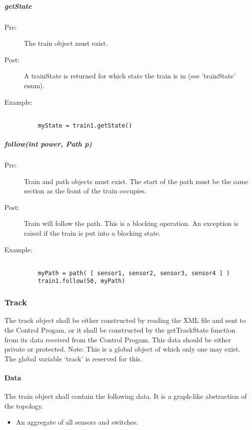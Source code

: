 \documentclass[a4paper,11pt,notitlepage]{article}
\def\CS{Control Progam\xspace}
\begin{document}
\subparagraph{getState}
\begin{description}
\item[\hspace{1cm}Pre:] The train object must exist.
\item[\hspace{1cm}Post:] A trainState is returned for which state the train is in (see 'trainState' enum).
\item[\hspace{1cm}Example:]
\begin{verbatim}

    myState = train1.getState()
\end{verbatim}
\end{description}

\subparagraph{follow(int power, Path p)}
\begin{description}
\item[\hspace{1cm}Pre:] Train and path objects must exist. The start of the path must be the same section as the front of the train occupies.
\item[\hspace{1cm}Post:] Train will follow the path. This is a blocking operation. An exception is raised if the train is put into a blocking state.
\item[\hspace{1cm}Example:]
\begin{verbatim}

    myPath = path( [ sensor1, sensor2, sensor3, sensor4 ] )
    train1.follow(50, myPath)
\end{verbatim}
\end{description}

\subsubsection{Track}
The track object shall be either constructed by reading the XML file and sent to the \CS, or it shall be constructed by the getTrackState function from its data received from the \CS. This data should be either private or protected.
Note: This is a global object of which only one may exist. The global variable `track' is reserved for this.
\paragraph{Data}
The train object shall contain the following data. It is a graph-like abstraction of the topology.
\begin{itemize}
\item An aggregate of all sensors and switches.
\end{itemize}
\end{document}
